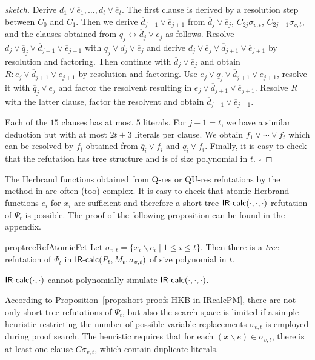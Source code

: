\documentclass{llncs}
\newcommand{\qres}{\mbox{\sf Q-res}}
\newcommand{\qures}{\mbox{\sf QU-res}}
\newcommand{\IRcalcPM}[2]{$\mbox{\sf IR-calc}(#1,#2)$}
\newcommand{\IRcalcPMSubst}[3]{$\mbox{\sf IR-calc}(#1,#2,#3)$}
\newcommand{\is}{\ensuremath{\backslash}}
\newcommand{\lequiv}{\leftrightarrow}
\newcommand{\hkb}{\ensuremath{\Psi}}
\newcommand{\hkbt}[1]{\ensuremath{\hkb_{#1}}}
\renewcommand{\qed}{\hfill\ensuremath{\square}}
\begin{document}
\begin{proof}[sketch]
Derive $\overline{d}_1 \lor \overline{e}_1, \ldots , \overline{d}_t
\lor \overline{e}_t$.  The first clause is derived by a resolution
step between $C_0$ and $C_1$. Then we derive $\overline{d}_{j+1} \lor
\overline{e}_{j+1}$ from $\overline{d}_j \lor \overline{e}_j$,
$C_{2j}\sigma_{v,t}$, $C_{2j+1}\sigma_{v,t}$, and the clauses obtained
from $q_j\lequiv \overline{d}_j \lor e_j$ as follows.
Resolve $d_j \lor \overline{q}_j \lor \overline{d}_{j+1} \lor
\overline{e}_{j+1}$ with $q_j \lor d_j\lor \overline{e}_j$ and derive 
$d_j \lor \overline{e}_j \lor \overline{d}_{j+1} \lor
\overline{e}_{j+1}$ by resolution and factoring. Then continue with 
$\overline{d}_j \lor \overline{e}_j$ and obtain 
$R\colon \overline{e}_j \lor \overline{d}_{j+1} \lor \overline{e}_{j+1}$
by resolution and factoring.
Use $e_j \lor q_j \lor \overline{d}_{j+1} \lor \overline{e}_{j+1}$,
resolve it with $\overline{q}_j\lor e_j$ and factor the resolvent
resulting in $e_j \lor \overline{d}_{j+1} \lor \overline{e}_{j+1}$.
Resolve $R$ with the latter clause, factor the resolvent and obtain
$\overline{d}_{j+1} \lor \overline{e}_{j+1}$.

Each of the $15$ clauses has at most $5$ literals. For $j+1=t$, we have
a similar deduction but with at most $2t+3$ literals per clause. We
obtain $\overline{f}_1\lor \cdots \lor \overline{f}_t$ which can be
resolved by $f_i$ obtained from $\overline{q}_i \lor f_i$ and $q_i
\lor f_i$. Finally, it is easy to check that the refutation has tree
structure and is of size polynomial in $t$.
\qed
\end{proof}
The Herbrand functions obtained from \qres{} or \qures{} refutations
by the method in \cite{DBLP:journals/fmsd/BalabanovJ12} are often
(too) complex. It is easy to check that atomic Herbrand
functions $e_i$ for $x_i$ are sufficient and therefore a short tree 
\IRcalcPMSubst{\cdot}{\cdot}{\cdot} refutation of \hkbt{t} is
possible.  The proof of the following proposition can be found in the
appendix.

\begin{restatable}{prop}{treeRefAtomicFct}
\label{prop:short-proofs-HKB-in-IRcalcPM}
Let $\sigma_{v,t}= \{x_i\is e_i \mid 1\leq i\leq t\}$. Then there is a
\emph{tree} refutation of \hkbt{t} in
\IRcalcPMSubst{P_t}{M_t}{\sigma_{v,t}}{} of size polynomial in $t$.
\end{restatable}

\begin{proposition}\label{prop:IRcalcPM-npsim-IRcalcPMSubst}
\IRcalcPM{\cdot}{\cdot}{} cannot polynomially simulate
\IRcalcPMSubst{\cdot}{\cdot}{\cdot}.
\end{proposition}
\noindent
According to Proposition~\ref{prop:short-proofs-HKB-in-IRcalcPM},
there are not only short tree refutations of \hkbt{t}, 
but also the search space is
limited if a simple heuristic restricting the number of possible
variable replacements $\sigma_{v,t}$ is employed during proof search.
The heuristic requires that for each $(x\is e)\in \sigma_{v,t}$, there
is at least one clause $C\sigma_{v,t}$, which contain duplicate
literals.
\end{document}
